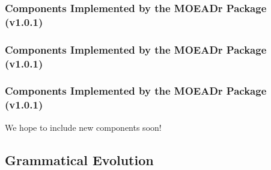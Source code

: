 \documentclass[aspectratio=169]{beamer}
\begin{document}
\begin{frame}
  \frametitle{Components Implemented by the MOEADr Package (v1.0.1)}

  {\scriptsize
    \begin{center}
      
    \end{center}
  }
\end{frame}

\begin{frame}
  \frametitle{Components Implemented by the MOEADr Package (v1.0.1)}

  {\scriptsize
    \begin{center}
      
    \end{center}
  }
\end{frame}

\begin{frame}
  \frametitle{Components Implemented by the MOEADr Package (v1.0.1)}

  {\scriptsize
    \begin{center}
      
    \end{center}

    \vspace{1cm}
  }
    We hope to include new components soon!

\end{frame}

\subsection{Grammatical Evolution}
\end{document}
